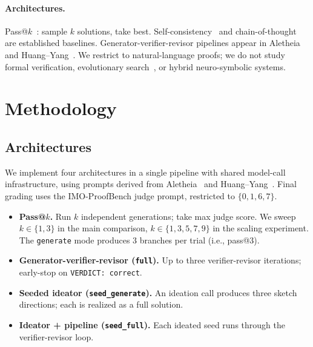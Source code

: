 \documentclass{article}
\begin{document}
\paragraph{Architectures.}
Pass@$k$~\citep{brown2020gpt3,chen2021codex}: sample $k$ solutions, take best.
Self-consistency~\citep{wang2022selfconsistency} and chain-of-thought~\citep{wei2022cot}
are established baselines.
Generator-verifier-revisor pipelines appear in
Aletheia~\citep{feng2026aletheia} and Huang--Yang~\citep{huang2025imogold}.
We restrict to natural-language proofs; we do not study formal
verification, evolutionary search~\citep{novikov2025alphaevolve,georgiev2025exploration},
or hybrid neuro-symbolic systems.

\section{Methodology}
\label{sec:method}

\subsection{Architectures}
\label{sec:arch}

We implement four architectures in a single pipeline with shared model-call
infrastructure, using prompts derived from Aletheia~\citep{feng2026aletheia} and
Huang--Yang~\citep{huang2025imogold}.
Final grading uses the IMO-ProofBench judge prompt, restricted to $\{0,1,6,7\}$.

\begin{itemize}
\setlength\itemsep{1pt}
\item \textbf{Pass@$k$.} Run $k$ independent generations; take max judge score.
  We sweep $k \in \{1,3\}$ in the main comparison, $k \in \{1,3,5,7,9\}$ in the
  scaling experiment. The \texttt{generate} mode produces 3 branches per trial
  (i.e., pass@3).
\item \textbf{Generator-verifier-revisor (\texttt{full}).} Up to three
  verifier-revisor iterations; early-stop on \texttt{VERDICT:~correct}.
\item \textbf{Seeded ideator (\texttt{seed\_generate}).} An ideation call produces
  three sketch directions; each is realized as a full solution.
\item \textbf{Ideator + pipeline (\texttt{seed\_full}).} Each ideated seed runs
  through the verifier-revisor loop.
\end{itemize}
\end{document}
